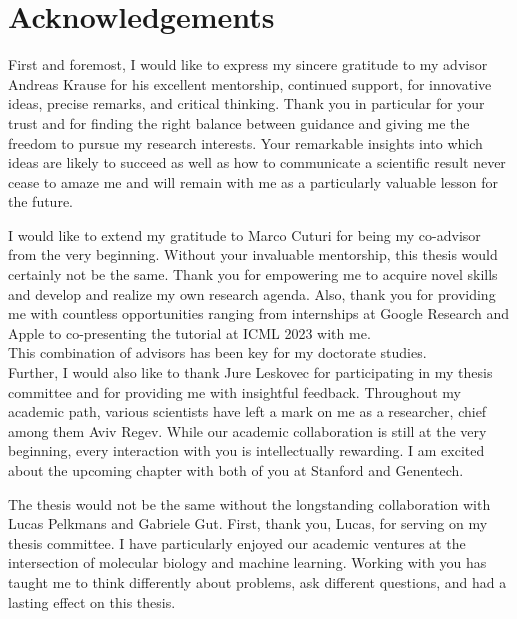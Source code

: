 
\bigskip

\begingroup
\let\clearpage\relax
\let\cleardoublepage\relax
\let\cleardoublepage\relax
\chapter*{Acknowledgements}

\def\thanks#1{%
\begingroup
\leftskip1em
\noindent #1
\par
\endgroup
}

First and foremost, I would like to express my sincere gratitude to my advisor Andreas Krause for his excellent mentorship, continued support, for innovative ideas, precise remarks, and critical thinking.
Thank you in particular for your trust and for finding the right balance between guidance and giving me the freedom to pursue my research interests.
Your remarkable insights into which ideas are likely to succeed as well as how to communicate a scientific result never cease to amaze me and will remain with me as a particularly valuable lesson for the future.

I would like to extend my gratitude to Marco Cuturi for being my co-advisor from the very beginning. 
Without your invaluable mentorship, this thesis would certainly not be the same. Thank you for empowering me to acquire novel skills and develop and realize my own research agenda.
Also, thank you for providing me with countless opportunities ranging from internships at Google Research and Apple to co-presenting the tutorial at ICML 2023 with me. \\
This combination of advisors has been key for my doctorate studies. \\

Further, I would also like to thank Jure Leskovec for participating in my thesis committee and for providing me with insightful feedback. 
Throughout my academic path, various scientists have left a mark on me as a researcher, chief among them Aviv Regev. While our academic collaboration is still at the very beginning, every interaction with you is intellectually rewarding.
I am excited about the upcoming chapter with both of you at Stanford and Genentech.

 The thesis would not be the same without the longstanding collaboration with Lucas Pelkmans and Gabriele Gut. First, thank you, Lucas, for serving on my thesis committee.
I have particularly enjoyed our academic ventures at the intersection  of molecular biology and machine learning. Working with you has taught me to think differently about problems, ask different questions, and had a lasting effect on this thesis.


